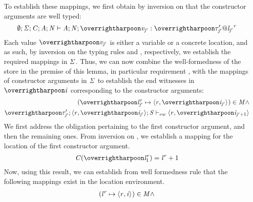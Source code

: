 \begin{nproof}
\begin{bcase}
\begin{itemize}
\begin{itemize}
\begin{itemize}
           To establish these mappings, we first
           obtain by inversion on \tdatacon{} that the
           constructor arguments are well typed:
           \begin{align*}
           \emptytenv;\SENV;\CENV;\AENV;\NENV \vdash \AENV;\NENV;\overharpoon{\VAL_{\indj'}} : \overharpoon{\tyatlocreg{\TYP_{\indj'}'}{\loc_{\indj'}}{\reg}}
           \end{align*}
           Each value $\overharpoon{\VAL_{\indj'}}$ is either a variable or a concrete location, and
           as such, by inversion on the typing rules \tvar{} and \tconcreteloc{}, respectively,
           we establish the required mappings in $\mathit{\Sigma}$.
           Thus, we can now combine the well-formedness
           of the store in the premise of this lemma,
           in particular requirement ,
           with the mappings of constructor arguments in $\mathit{\Sigma}$ to establish
           the end witnesses in $\overharpoon{\ind}$ corresponding to the constructor arguments:
           \begin{align}
           (\overharpoon{\locreg{\loc}{\reg}_{\indj'}} \mapsto \concreteloc{\reg}{\overharpoon{\ind_{\indj'}}}{}) \in \MENV \wedge \label{prf:dc-ew1} \\
           \ewitness{\overharpoon{\TYP_{\indj'}'}}{\concreteloc{\reg}{\overharpoon{\ind_{\indj'}}}{}}{\STOR}{\concreteloc{\reg}{\overharpoon{\ind_{\indj' + 1}}}{}} \label{prf:dc-ew2}
           \end{align}
           We first address the obligation pertaining to the first constructor argument,
           and then the remaining ones.
           From inversion on \tdatacon{}, we establish a mapping for the location of the
           first constructor argument.
           \begin{align*}
           \CENV(\overharpoon{\locreg{\loc}{\reg}_1}) = \locreg{\loc}{\reg} + 1
           \end{align*}
           Now, using this result, we can establish from well
           formedness rule 
           that the following mappings exist in the location environment.
           \begin{align*}
           (\locreg{\loc}{\reg} \mapsto \concreteloc{\reg}{\ind}{})  \in \MENV \wedge \\

\end{align*}
\end{itemize}
\end{itemize}
\end{itemize}
\end{bcase}
\end{nproof}
